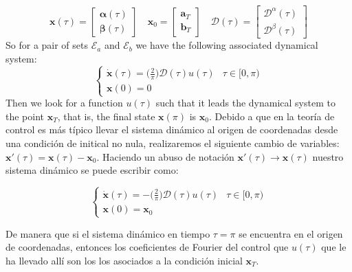 \begin{equation}
    \bm{x}(\tau) = \begin{bmatrix}
        \bm{\alpha}(\tau) \\  \bm{\beta}(\tau)
    \end{bmatrix} \hspace{1em}
    \bm{x}_0 = \begin{bmatrix}
        \bm{a}_T \\  \bm{b}_T
    \end{bmatrix} \hspace{1em}
    \bm{\mathcal{D}}(\tau) = \begin{bmatrix}
        \bm{\mathcal{D}}^\alpha(\tau) \\  
        \bm{\mathcal{D}}^\beta(\tau)
    \end{bmatrix}     
\end{equation}
So for a pair of sets $ \mathcal {E} _a $ and $ \mathcal {E} _b $ we have the following associated dynamical system:
\begin{equation}
    \begin{cases}
        \dot{\bm{x}}(\tau) = \big(\frac{2}{\pi}\big)\bm{\mathcal{D}}(\tau) u(\tau)  & \tau \in [0,\pi)\\
        \bm{x}(0) = {0}
    \end{cases}
\end{equation}
Then we look for a function $ u (\tau) $ such that it leads the dynamical system to the point $ \bm {x} _T $, that is, the final state $ \bm {x} (\pi) $ is $ \bm {x}_0 $. Debido a que en la teoría de control es más típico llevar el sistema dinámico al origen de coordenadas desde una condición de initical no nula, realizaremos el siguiente cambio de variables: $\bm{x}'(\tau) = \bm{x}(\tau) - \bm{x}_0$. Haciendo un abuso de notación $\bm{x}'(\tau) \rightarrow \bm{x}(\tau)$  nuestro sistema dinámico se puede escribir como:

\begin{equation}
    \begin{cases}
        \dot{\bm{x}}(\tau) = -\big(\frac{2}{\pi}\big)\bm{\mathcal{D}}(\tau) u(\tau)  & \tau \in [0,\pi)\\
        \bm{x}(0) = \bm{x}_0
    \end{cases}
\end{equation}

De manera que si el sistema dinámico en tiempo $\tau = \pi$ se encuentra en el origen de coordenadas, entonces los coeficientes de Fourier del control que $u(\tau)$ que le ha llevado allí son los los asociados a la condición inicial $\bm{x}_T$. 

